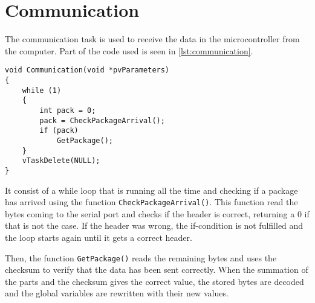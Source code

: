\section{Communication}
The communication task is used to receive the data in the microcontroller from the computer. Part of the code used is seen in \autoref{lst:communication}.

\begin{lstlisting}[style=customcpp,
                caption={Code for the comunication task.}, 
                label=lst:communication]
void Communication(void *pvParameters)
{
    while (1)
    {
        int pack = 0;
        pack = CheckPackageArrival();
        if (pack)
            GetPackage();
    }
    vTaskDelete(NULL);
}
\end{lstlisting}

It consist of a while loop that is running all the time and checking if a package has arrived using the function \lstinline[style=customcppinline]{CheckPackageArrival()}. This function read the bytes coming to the serial port and checks if the header is correct, returning a 0 if that is not the case. If the header was wrong, the if-condition is not fulfilled and the loop starts again until it gets a correct header.

Then, the function \lstinline[style=customcppinline]{GetPackage()} reads the remaining bytes and uses the checksum to verify that the data has been sent correctly. When the summation of the parts and the checksum gives the correct value, the stored bytes are decoded and the global variables are rewritten with their new values.